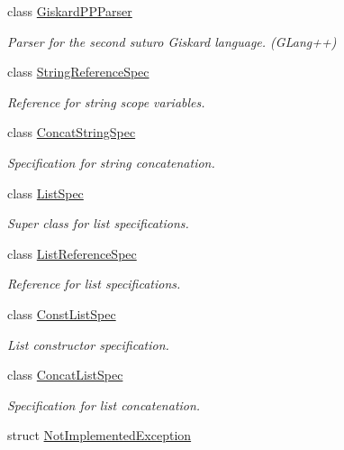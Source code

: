 \begin{DoxyCompactItemize}
class \hyperlink{classgiskard__suturo_1_1GiskardPPParser}{Giskard\-P\-P\-Parser}
\begin{DoxyCompactList}\small\item\em Parser for the second suturo Giskard language. (G\-Lang++) \end{DoxyCompactList}\item 
class \hyperlink{classgiskard__suturo_1_1StringReferenceSpec}{String\-Reference\-Spec}
\begin{DoxyCompactList}\small\item\em Reference for string scope variables. \end{DoxyCompactList}\item 
class \hyperlink{classgiskard__suturo_1_1ConcatStringSpec}{Concat\-String\-Spec}
\begin{DoxyCompactList}\small\item\em Specification for string concatenation. \end{DoxyCompactList}\item 
class \hyperlink{classgiskard__suturo_1_1ListSpec}{List\-Spec}
\begin{DoxyCompactList}\small\item\em Super class for list specifications. \end{DoxyCompactList}\item 
class \hyperlink{classgiskard__suturo_1_1ListReferenceSpec}{List\-Reference\-Spec}
\begin{DoxyCompactList}\small\item\em Reference for list specifications. \end{DoxyCompactList}\item 
class \hyperlink{classgiskard__suturo_1_1ConstListSpec}{Const\-List\-Spec}
\begin{DoxyCompactList}\small\item\em List constructor specification. \end{DoxyCompactList}\item 
class \hyperlink{classgiskard__suturo_1_1ConcatListSpec}{Concat\-List\-Spec}
\begin{DoxyCompactList}\small\item\em Specification for list concatenation. \end{DoxyCompactList}\item 
struct \hyperlink{structgiskard__suturo_1_1NotImplementedException}{Not\-Implemented\-Exception}
\end{DoxyCompactItemize}
